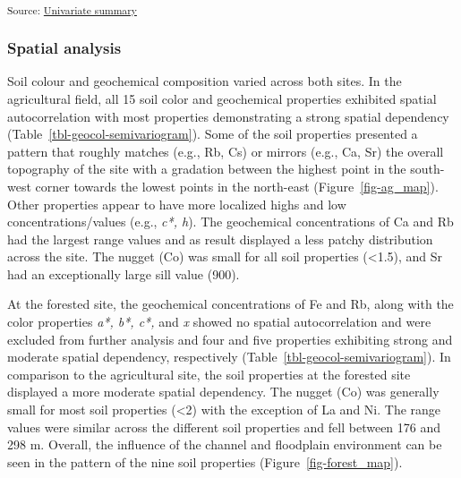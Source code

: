 \documentclass[
  number]{elsarticle}
\begin{document}
\textsubscript{Source:
\href{https://alex-koiter.github.io/spatial-variability-soil-manuscript/notebooks/univariate_summary.qmd.html\#cell-tbl-univariate2-summary}{Univariate
summary}}

\subsubsection{Spatial analysis}\label{spatial-analysis}

Soil colour and geochemical composition varied across both sites. In the
agricultural field, all 15 soil color and geochemical properties
exhibited spatial autocorrelation with most properties demonstrating a
strong spatial dependency (Table~\ref{tbl-geocol-semivariogram}). Some
of the soil properties presented a pattern that roughly matches (e.g.,
Rb, Cs) or mirrors (e.g., Ca, Sr) the overall topography of the site
with a gradation between the highest point in the south-west corner
towards the lowest points in the north-east (Figure~\ref{fig-ag_map}).
Other properties appear to have more localized highs and low
concentrations/values (e.g., \emph{c*, h}). The geochemical
concentrations of Ca and Rb had the largest range values and as result
displayed a less patchy distribution across the site. The nugget (Co)
was small for all soil properties (\textless1.5), and Sr had an
exceptionally large sill value (900).

At the forested site, the geochemical concentrations of Fe and Rb, along
with the color properties \emph{a*, b*, c*,} and \emph{x} showed no
spatial autocorrelation and were excluded from further analysis and four
and five properties exhibiting strong and moderate spatial dependency,
respectively (Table~\ref{tbl-geocol-semivariogram}). In comparison to
the agricultural site, the soil properties at the forested site
displayed a more moderate spatial dependency. The nugget (Co) was
generally small for most soil properties (\textless2) with the exception
of La and Ni. The range values were similar across the different soil
properties and fell between 176 and 298 m. Overall, the influence of the
channel and floodplain environment can be seen in the pattern of the
nine soil properties (Figure~\ref{fig-forest_map}).
\end{document}
